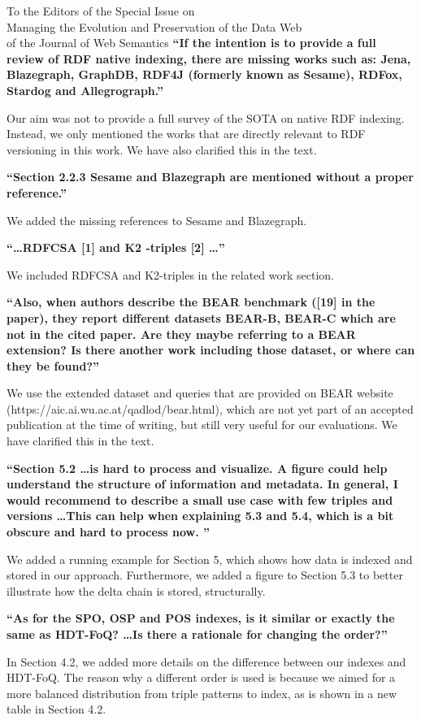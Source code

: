 \documentclass{letter}
\newcounter{section}
\begin{document}
\begin{letter}{To the Editors of the Special Issue on\\Managing the Evolution and Preservation of the Data Web\\of the Journal of Web Semantics}
\textbf{\enquote{If the intention is to provide a full review of RDF native indexing, there are missing works such as: Jena, Blazegraph, GraphDB, RDF4J (formerly known as Sesame), RDFox, Stardog and Allegrograph.}}

Our aim was not to provide a full survey of the SOTA on native RDF indexing.
Instead, we only mentioned the works that are directly relevant to RDF versioning in this work.
We have also clarified this in the text.

\textbf{\enquote{Section 2.2.3 Sesame and Blazegraph are mentioned without a proper reference.}}

We added the missing references to Sesame and Blazegraph.

\textbf{\enquote{\ldots RDFCSA [1] and K2 -triples [2] \ldots}}

We included RDFCSA and K2-triples in the related work section.

\textbf{\enquote{Also, when authors describe the BEAR benchmark ([19] in the paper), they report different datasets BEAR-B, BEAR-C which are not in the cited paper. Are they maybe referring to a BEAR extension? Is there another work including those dataset, or where can they be found?}}

We use the extended dataset and queries that are provided on BEAR website \\(https://aic.ai.wu.ac.at/qadlod/bear.html),
which are not yet part of an accepted publication at the time of writing,
but still very useful for our evaluations.
We have clarified this in the text.

\textbf{\enquote{Section 5.2 \ldots is hard to process and visualize. A figure could help understand the structure of information and metadata. In general, I would recommend to describe a small use case with few triples and versions \ldots This can help when explaining 5.3 and 5.4, which is a bit obscure and hard to process now. }}

We added a running example for Section 5, which shows how data is indexed and stored in our approach.
Furthermore, we added a figure to Section 5.3 to better illustrate how the delta chain is stored, structurally.

\textbf{\enquote{As for the SPO, OSP and POS indexes, is it similar or exactly the same as HDT-FoQ? \ldots Is there a rationale for changing the order?}}

In Section 4.2, we added more details on the difference between our indexes and HDT-FoQ.
The reason why a different order is used is because we aimed for a more balanced distribution from triple patterns to index,
as is shown in a new table in Section 4.2.


\end{letter}
\end{document}
